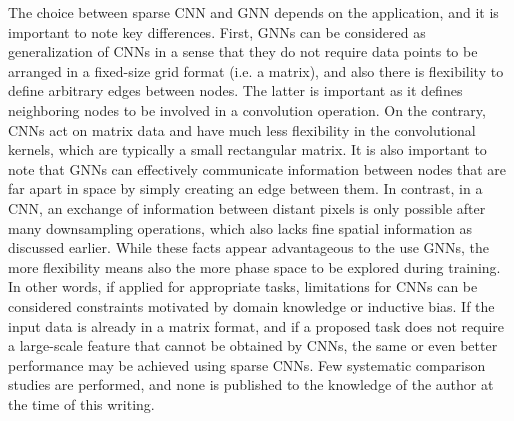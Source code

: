 \documentclass{ws-rv9x6}
\begin{document}
The choice between sparse CNN and GNN depends on the application, and it is important to note key differences. First, GNNs can be considered as generalization of CNNs in a sense that they do not require data points to be arranged in a fixed-size grid format (i.e. a matrix), and also there is flexibility to define arbitrary edges between nodes. The latter is important as it defines neighboring nodes to be involved in a convolution operation. On the contrary, CNNs act on matrix data and have much less flexibility in the convolutional kernels, which are typically a small rectangular matrix. It is also important to note that GNNs can effectively communicate information between nodes that are far apart in space by simply creating an edge between them. In contrast, in a CNN, an exchange of information between distant pixels is only possible after many downsampling operations, which also lacks fine spatial information as discussed earlier. While these facts appear advantageous to the use GNNs, the more flexibility means also the more phase space to be explored during training. In other words, if applied for appropriate tasks, limitations for CNNs can be considered constraints motivated by domain knowledge or inductive bias. If the input data is already in a matrix format, and if a proposed task does not require a large-scale feature that cannot be obtained by CNNs, the same or even better performance may be achieved using sparse CNNs. Few systematic comparison studies are performed, and none is published to the knowledge of the author at the time of this writing.
\end{document}
